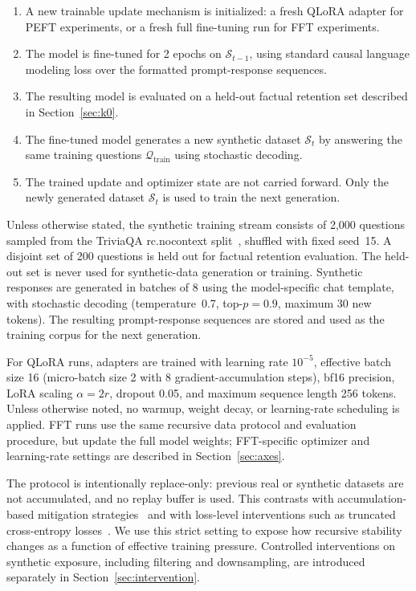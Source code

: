 \documentclass[a4paper,fleqn]{cas-dc}
\begin{document}
\begin{enumerate}
    \item A new trainable update mechanism is initialized: a fresh QLoRA adapter
    for PEFT experiments, or a fresh full fine-tuning run for FFT experiments.
    \item The model is fine-tuned for 2 epochs on $\mathcal{S}_{t-1}$, using
    standard causal language modeling loss over the formatted prompt-response
    sequences.
    \item The resulting model is evaluated on a held-out factual retention set
    described in Section~\ref{sec:k0}.
    \item The fine-tuned model generates a new synthetic dataset
    $\mathcal{S}_t$ by answering the same training questions
    $\mathcal{Q}_{\mathrm{train}}$ using stochastic decoding.
    \item The trained update and optimizer state are not carried forward. Only
    the newly generated dataset $\mathcal{S}_t$ is used to train the next
    generation.
\end{enumerate}

Unless otherwise stated, the synthetic training stream consists of 2{,}000
questions sampled from the TriviaQA rc.nocontext split~\citep{joshi2017},
shuffled with fixed seed~15. A disjoint set of 200 questions is held out for
factual retention evaluation. The held-out set is never used for synthetic-data
generation or training. Synthetic responses are generated in batches of 8 using
the model-specific chat template, with stochastic decoding
(temperature~0.7, top-$p=0.9$, maximum 30 new tokens). The resulting
prompt-response sequences are stored and used as the training corpus for the
next generation.

For QLoRA runs, adapters are trained with learning rate $10^{-5}$, effective
batch size 16 (micro-batch size 2 with 8 gradient-accumulation steps), bf16
precision, LoRA scaling $\alpha=2r$, dropout 0.05, and maximum sequence length
256 tokens. Unless otherwise noted, no warmup, weight decay, or learning-rate
scheduling is applied. FFT runs use the same recursive data protocol and
evaluation procedure, but update the full model weights; FFT-specific optimizer
and learning-rate settings are described in Section~\ref{sec:axes}.

The protocol is intentionally replace-only: previous real or synthetic datasets
are not accumulated, and no replay buffer is used. This contrasts with
accumulation-based mitigation strategies~\citep{gerstgrasser2024} and with
loss-level interventions such as truncated cross-entropy
losses~\citep{zibakhsh2024}. We use this strict setting to expose how recursive
stability changes as a function of effective training pressure. Controlled
interventions on synthetic exposure, including filtering and downsampling, are
introduced separately in Section~\ref{sec:intervention}.
\end{document}
